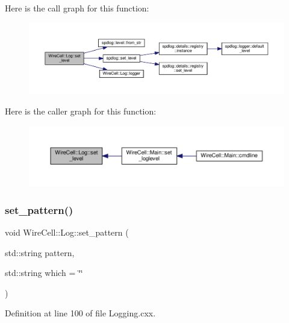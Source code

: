 Here is the call graph for this function\+:
\nopagebreak
\begin{figure}[H]
\begin{center}
\leavevmode
\includegraphics[width=350pt]{namespace_wire_cell_1_1_log_af453ddce8d810f730dca72024376727e_cgraph}
\end{center}
\end{figure}
Here is the caller graph for this function\+:
\nopagebreak
\begin{figure}[H]
\begin{center}
\leavevmode
\includegraphics[width=350pt]{namespace_wire_cell_1_1_log_af453ddce8d810f730dca72024376727e_icgraph}
\end{center}
\end{figure}
\mbox{\label{namespace_wire_cell_1_1_log_accaf0fe0149777811d7c5a648fe3f5e4}} 
\subsubsection{\texorpdfstring{set\+\_\+pattern()}{set\_pattern()}}
{\footnotesize\ttfamily void Wire\+Cell\+::\+Log\+::set\+\_\+pattern (\begin{DoxyParamCaption}\item[{std\+::string}]{pattern,  }\item[{std\+::string}]{which = {\ttfamily \char`\"{}\char`\"{}} }\end{DoxyParamCaption})}



Definition at line 100 of file Logging.\+cxx.

